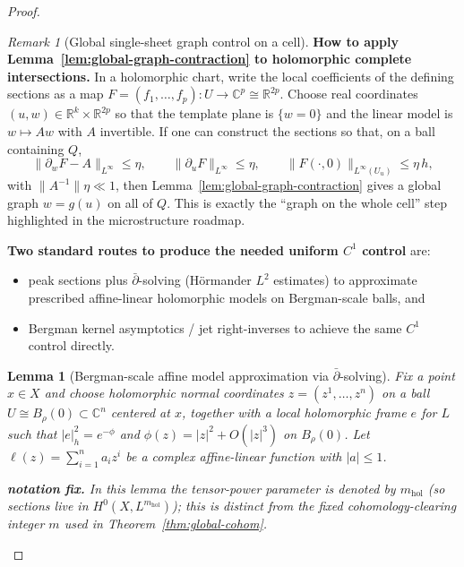 \documentclass[11pt]{article}
\newcommand{\REVMZ}[1]{\textcolor{teal}{#1}}  %
\numberwithin{equation}{section}  %
\theoremstyle{plain}
\newtheorem{lemma}[theorem]{Lemma}
\theoremstyle{definition}
\theoremstyle{remark}
\newtheorem{remark}[theorem]{Remark}
\newcommand{\R}{\mathbb{R}}
\newcommand{\C}{\mathbb{C}}
\newcommand{\mhol}{m_{\mathrm{hol}}} %
\begin{document}
\begin{proof}
\begin{remark}[Global single-sheet graph control on a cell]
\smallskip\noindent
\textbf{How to apply Lemma~\ref{lem:global-graph-contraction} to holomorphic complete intersections.}
In a holomorphic chart, write the local coefficients of the defining sections as a map
$F=(f_1,\dots,f_p):U\to \C^p\cong\R^{2p}$.  Choose real coordinates $(u,w)\in\R^{k}\times\R^{2p}$ so that the template
plane is $\{w=0\}$ and the linear model is $w\mapsto Aw$ with $A$ invertible.
If one can construct the sections so that, on a ball containing $Q$,
\[
\|\partial_wF-A\|_{L^\infty}\le \eta,\qquad \|\partial_uF\|_{L^\infty}\le \eta,\qquad
\|F(\cdot,0)\|_{L^\infty(U_u)}\le \eta\,h,
\]
with $\|A^{-1}\|\eta\ll 1$, then Lemma~\ref{lem:global-graph-contraction} gives a global graph $w=g(u)$ on all of $Q$.
This is exactly the ``graph on the whole cell'' step highlighted in the microstructure roadmap.

\smallskip\noindent
\textbf{Two standard routes to produce the needed uniform $C^1$ control} are:
\begin{itemize}
\item peak sections plus $\bar\partial$-solving (H\"ormander $L^2$ estimates) to approximate prescribed affine-linear holomorphic models on
Bergman-scale balls, and
\item Bergman kernel asymptotics / jet right-inverses \REVMZ{\cite{Tian90,Catlin99,Zelditch98,Donaldson01}} to achieve the same $C^1$ control directly.
\end{itemize}
\end{remark}


\begin{lemma}[Bergman-scale affine model approximation via $\bar\partial$-solving]\label{lem:bergman-affine-approx-hormander}
Fix a point $x\in X$ and choose holomorphic normal coordinates $z=(z^1,\dots,z^n)$ on a ball
$U\cong B_\rho(0)\subset\C^n$ centered at $x$, together with a local holomorphic frame $e$ for $L$
such that $|e|_h^2=e^{-\phi}$ and $\phi(z)=|z|^2+O(|z|^3)$ on $B_\rho(0)$.
Let $\ell(z)=\sum_{i=1}^n a_i z^i$ be a complex affine-linear function with $|a|\le 1$.

{\noindent\textbf{notation fix.}
In this lemma the tensor-power parameter is denoted by $\mhol$ (so sections live in $H^0(X,L^{\mhol})$);
this is distinct from the fixed cohomology-clearing integer $m$ used in Theorem~\ref{thm:global-cohom}.}


\end{lemma}
\end{proof}
\end{document}
